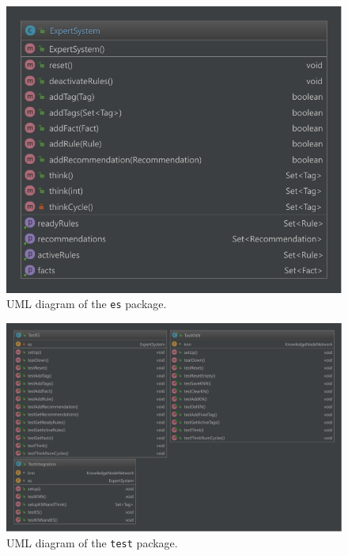 \documentclass[titlepage,11pt]{article}
\newcommand{\code}[1]{\texttt{#1}}
\begin{document}
\begin{figure}[!htb]
	\centering
	\includegraphics[width=0.5\columnwidth]{figures/uml_es.pdf}
	\caption{UML diagram of the \code{es} package.}
	\label{uml_es}
\end{figure}

\begin{figure}[!htb]
	\centering
	\includegraphics[width=\columnwidth]{figures/uml_test.pdf}
	\caption{UML diagram of the \code{test} package.}
	\label{uml_test}
\end{figure}

\clearpage

{}

\end{document}
